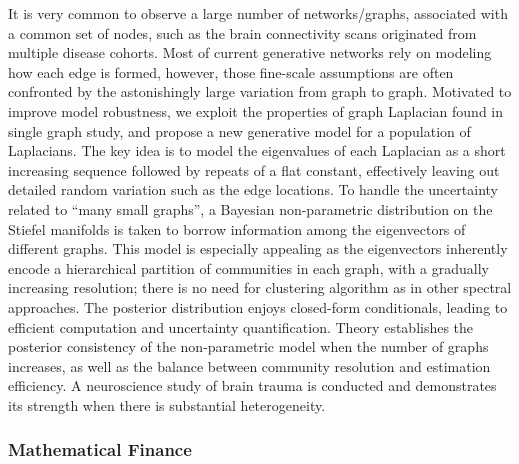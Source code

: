 \begin{itemize}
It is very common to observe a large number of networks/graphs, associated with a common set of nodes, such as the brain connectivity scans originated from multiple disease cohorts. Most of current generative networks rely on modeling how each edge is formed, however, those fine-scale assumptions are often confronted by the astonishingly large variation from graph to graph. Motivated to improve model robustness, we exploit the properties of graph Laplacian found in single graph study, and propose a new generative model for a population of Laplacians. The key idea is to model the eigenvalues of each Laplacian as a short increasing sequence followed by repeats of a flat constant, effectively leaving out detailed random variation such as the edge locations. To handle the uncertainty related to ``many small graphs'', a Bayesian non-parametric distribution on the Stiefel manifolds is taken to borrow information among the eigenvectors of different graphs. This model is especially appealing as the eigenvectors inherently encode a hierarchical partition of communities in each graph, with a gradually increasing resolution; there is no need for clustering algorithm as in other spectral approaches. The posterior distribution enjoys closed-form conditionals, leading to efficient computation and uncertainty quantification. Theory establishes the posterior consistency of the non-parametric model when the number of graphs increases, as well as the balance between community resolution and estimation efficiency. A neuroscience study of brain trauma is conducted and demonstrates its strength when there is substantial heterogeneity.

\end{itemize}

\subsubsection*{Mathematical Finance}

